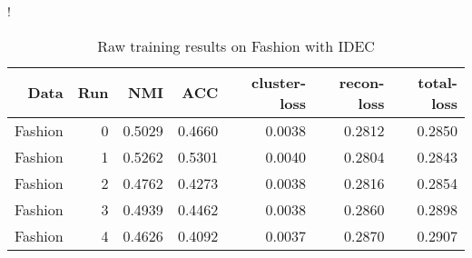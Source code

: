 \begin{table}[h]
\caption{Raw training results on Fashion with IDEC}\label{tab:idec-raw-Fashion}
\resizebox{\columnwidth}!{
\begin{tabular}{ | r | r | r | r | r | r | r |}
\hline
Data & Run & NMI & ACC & cluster-loss & recon-loss & total-loss  \\ \hline 
Fashion & 0 & 0.5029 & 0.4660 & 0.0038 & 0.2812 & 0.2850 \\ 
Fashion & 1 & 0.5262 & 0.5301 & 0.0040 & 0.2804 & 0.2843 \\ \hdashline 
Fashion & 2 & 0.4762 & 0.4273 & 0.0038 & 0.2816 & 0.2854 \\ 
Fashion & 3 & 0.4939 & 0.4462 & 0.0038 & 0.2860 & 0.2898 \\ \hdashline 
Fashion & 4 & 0.4626 & 0.4092 & 0.0037 & 0.2870 & 0.2907 \\ 
\hline
\end{tabular}
}
\end{table}